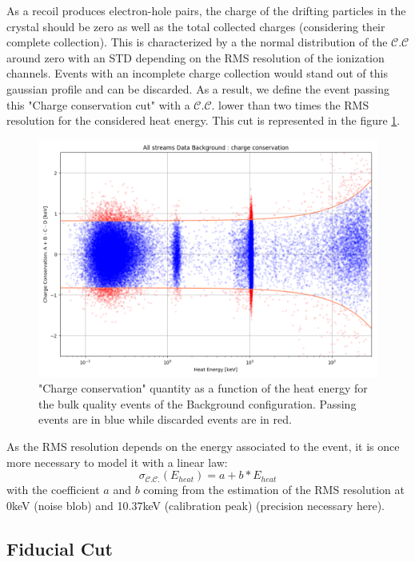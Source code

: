 As a recoil produces electron-hole pairs, the charge of the drifting particles in the crystal should be zero as well as the total collected charges (considering their complete collection). This is characterized by a the normal distribution of the $\mathcal{C.C}$ around zero with an STD depending on the RMS resolution of the ionization channels. Events with an incomplete charge collection would stand out of this gaussian profile and can be discarded. As a result, we define the event passing this "Charge conservation cut" with a $\mathcal{C.C.}$ lower than two times the RMS resolution for the considered heat energy. This cut is represented in the figure \ref{fig:charge-conservation}.

\begin{figure}
\centering
\includegraphics[width=\linewidth,]{Figures/Neutron/charge_conservation.png}
\caption{"Charge conservation" quantity as a function of the heat energy for the bulk quality events of the Background configuration. Passing events are in blue while discarded events are in red.}
\label{fig:charge-conservation}
\end{figure}

As the RMS resolution depends on the energy associated to the event, it is once more necessary to model it with a linear law:
\begin{equation}
\sigma_{\mathcal{C.C.}}\left(E_{heat}\right)
=
a + b*E_{heat}
\end{equation}
with the coefficient $a$ and $b$ coming from the estimation of the RMS resolution at 0keV (noise blob) and 10.37keV (calibration peak) (precision necessary here).


\subsection{Fiducial Cut}
\label{par:fiducial-cut}

